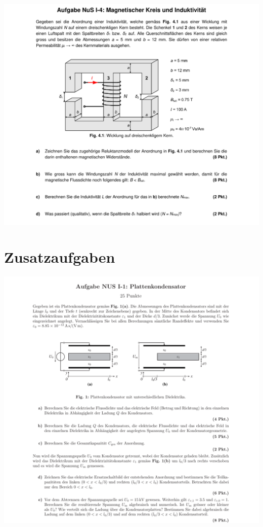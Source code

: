\documentclass[a4paper, 8pt, landscape]{scrartcl} %
\begin{document}
\begin{multicols}{2}
    \vfill \null \columnbreak
    \includegraphics[width=\columnwidth]{img/a2.pdf} \\
  \vfill \null \columnbreak



  \newpage
  \section{Zusatzaufgaben}




  \begin{center}
      \includegraphics[width= \columnwidth]{img/efeld2.pdf} \\
  \end{center}
    \vfill \null \columnbreak


\end{multicols}
\end{document}
